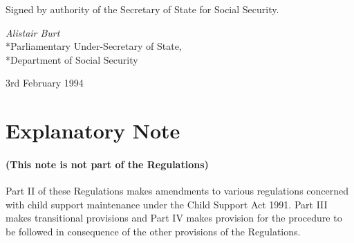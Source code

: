 \documentclass[12pt,a4paper]{article}
\begin{document}

%
%
%

\bigskip

Signed by authority of the Secretary of State for Social Security.

{\raggedleft
\emph{Alistair Burt}\\*Parliamentary Under-Secretary of State,\\*Department of Social Security

}

3rd February 1994

\small

\part{Explanatory Note}

\renewcommand\parthead{--- Explanatory Note}

\subsection*{(This note is not part of the Regulations)}

Part II of these Regulations makes amendments to various regulations concerned with child support maintenance under the Child Support Act 1991. Part III makes transitional provisions and Part IV makes provision for the procedure to be followed in consequence of the other provisions of the Regulations.
\end{document}
